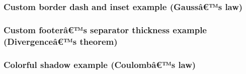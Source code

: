 \subsubsection{\texorpdfstring{\protect{}}{Custom radius}}\label{custom-radius}

\subsubsection{Custom border dash and inset example (Gaussâ€™s
law)}\label{custom-border-dash-and-inset-example-gaussuxe2s-law}

\subsubsection{\texorpdfstring{\protect{}}{Custom radius}}\label{custom-radius-1}

\subsubsection{Custom footerâ€™s separator thickness example
(Divergenceâ€™s
theorem)}\label{custom-footeruxe2s-separator-thickness-example-divergenceuxe2s-theorem}

\subsubsection{\texorpdfstring{\protect{}}{Custom radius}}\label{custom-radius-2}

\subsubsection{Colorful shadow example (Coulombâ€™s
law)}\label{colorful-shadow-example-coulombuxe2s-law}

\subsubsection{\texorpdfstring{\protect{}}{Custom radius}}\label{custom-radius-3}

